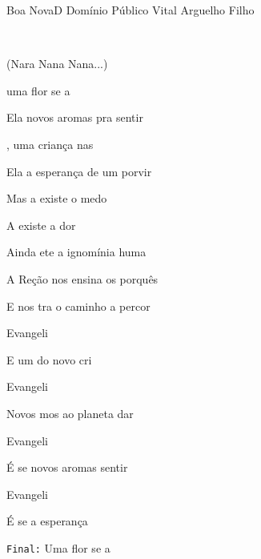 \documentclass[a4,12pt,oneside]{book}
\newcommand{\RevDate}{\today}
\newcommand{\NotCCLIed}{\relax}
\renewcommand{\SBPubDom}{Domínio Público}
\begin{document}
\begin{song}{Boa Nova}{D}
  {\SBPubDom}
  {Vital Arguelho Filho}
  {}
  {\NotCCLIed}
  
	\renewcommand{\RevDate}{24 de julho de 2014}
  

	\ifChordBk
		{\vspace{-2em}\flushright{\Dchord \quad \Bmchord \quad \Gchord \quad \Achord \quad \Fsusmchord}\\}
		\vspace{-2em}
	\fi
	
	\begin{SBVerse*}
		(Nara Nana Nana...)
		
		 uma flor se a
		
	    Ela  novos aromas pra sentir 
	    
	    , uma criança nas
	    
	    Ela  a esperança de um porvir 

		Mas a existe o medo

		A existe a dor
		
		Ainda ete a ignomínia huma
		
		A Reção nos ensina  os porquês
		
		E nos tra o caminho a percor
    \end{SBVerse*}
    
    \begin{SBChorus}
		Evangeli
		
		E um do novo cri ~ 
		
		Evangeli
		
		Novos mos ao planeta  dar 
		
		Evangeli
		
		É se  novos aromas  sentir 

		Evangeli
		
		É se  a esperança  
    \end{SBChorus}
	
	\begin{SBOpGroup}
		{\small\texttt{Final:}}{ Uma flor se a}
	\end{SBOpGroup}
\end{song}
\end{document}
